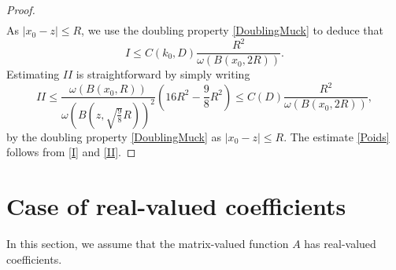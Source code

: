 \documentclass[12pt, letterpaper]{amsart}
\theoremstyle{definition}
\theoremstyle{remark}
\numberwithin{equation}{section}
\begin{document}
\begin{proof}
\begin{align*}
\end{align*}
As $|x_0-z| \leq R$, we use the doubling property \eqref{DoublingMuck} to deduce that
\begin{equation}\label{I}
     I \leq C(k_0,D) \frac{R^2}{\omega(B(x_0,2R))}.
\end{equation}
Estimating $II$ is straightforward by simply writing  
\begin{equation}\label{II}
    II \leq \frac{\omega(B(x_0,R))}{\omega(B(z,\sqrt{\frac{9}{8}}R))^2} \left ( 16R^2- \frac{9}{8}R^2 \right ) \leq C(D) \frac{R^2}{\omega(B(x_0,2R))},
\end{equation}
by the doubling property \eqref{DoublingMuck} as $|x_0-z| \leq R$. The estimate \eqref{Poids} follows from \eqref{I} and \eqref{II}. 
\end{proof}




\section{Case of real-valued coefficients}\label{section 5} 
In this section, we assume that the matrix-valued function $A$ has real-valued coefficients.
\end{document}

